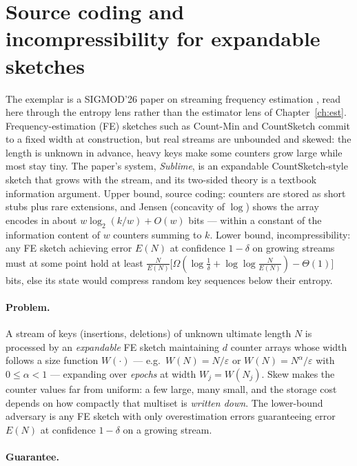 \section[Source coding for expandable sketches]{Source coding and incompressibility for expandable sketches}
\label{sec:inf-sublime}

The exemplar is a SIGMOD'26 paper on streaming frequency estimation
\citep{sigmod26-231}, read here through the entropy lens rather than the estimator
lens of Chapter~\ref{ch:est}. Frequency-estimation (FE) sketches such as Count-Min and
CountSketch commit to a fixed width at construction, but real streams are unbounded
and skewed: the length is unknown in advance, heavy keys make some counters grow
large while most stay tiny. The paper's system, \emph{Sublime}, is an expandable
CountSketch-style sketch that grows with the stream, and its two-sided theory is a
textbook information argument. Upper bound, source coding: counters are stored as
short stubs plus rare extensions, and Jensen (concavity of $\log$) shows the array
encodes in about $w \log_2(k/w) + O(w)$ bits --- within a constant of the information
content of $w$ counters summing to $k$. Lower bound, incompressibility: any FE sketch
achieving error $E(N)$ at confidence $1-\delta$ on growing streams must at some point
hold at least $\frac{N}{E(N)}\bigl[\Omega(\log \frac1\delta +
\log\log\frac{N}{E(N)}) - \Theta(1)\bigr]$ bits, else its state would compress random
key sequences below their entropy.

\paragraph{Problem.}
A stream of keys (insertions, deletions) of unknown ultimate length $N$ is processed
by an \emph{expandable} FE sketch maintaining $d$ counter arrays whose width follows a
size function $W(\cdot)$ --- e.g.\ $W(N) = N/\varepsilon$ or $W(N) =
N^\alpha/\varepsilon$ with $0 \le \alpha < 1$ --- expanding over \emph{epochs} at
width $W_j = W(N_j)$. Skew makes the counter values far from uniform: a few large,
many small, and the storage cost depends on how compactly that multiset is
\emph{written down}. The lower-bound adversary is any FE sketch with only
overestimation errors guaranteeing error $E(N)$ at confidence $1-\delta$ on a
growing stream.

\paragraph{Guarantee.}

